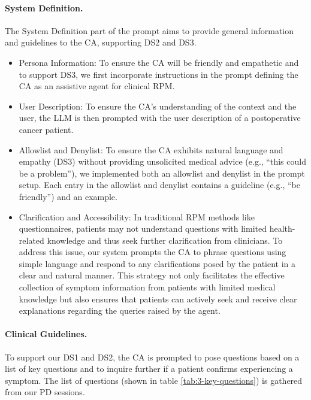 \paragraph{System Definition.} 
The System Definition part of the prompt aims to provide general information and guidelines to the CA, supporting DS2 and DS3.
\begin{itemize}

\item Persona Information:
To ensure the CA will be friendly and empathetic and to support DS3, we first incorporate instructions in the prompt defining the CA as an assistive agent for clinical RPM.

\item User Description:
To ensure the CA's understanding of the context and the user, the LLM is then prompted with the user description of a postoperative cancer patient.

\item Allowlist and Denylist:
To ensure the CA exhibits natural language and empathy (DS3) without providing unsolicited medical advice (e.g., ``this could be a problem''), we implemented both an allowlist and denylist in the prompt setup. 
Each entry in the allowlist and denylist contains a guideline (e.g., ``be friendly'') and an example.

\item Clarification and Accessibility:
In traditional RPM methods like questionnaires, patients may not understand questions with limited health-related knowledge and thus seek further clarification from clinicians. 
To address this issue, our system prompts the CA to phrase questions using simple language and respond to any clarifications posed by the patient in a clear and natural manner. 
This strategy not only facilitates the effective collection of symptom information from patients with limited medical knowledge but also ensures that patients can actively seek and receive clear explanations regarding the queries raised by the agent.

\end{itemize}
\paragraph{Clinical Guidelines.}
To support our DS1 and DS2, the CA is prompted to pose questions based on a list of key questions and to inquire further if a patient confirms experiencing a symptom. 
The list of questions (shown in table \ref{tab:3-key-questions}) is gathered from our PD sessions.


